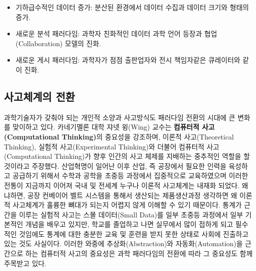 \documentclass[smallextended]{svjour3}       %
\providecommand{\tightlist}{%
  \setlength{\itemsep}{0pt}\setlength{\parskip}{0pt}}
\begin{document}
\begin{itemize}
\tightlist
\item
  기하급수적인 데이터 증가: 분산된 환경에서 데이터 수집과 데이터 크기와
  형태의 증가.
\item
  새로운 분석 패러다임: 과학자 친화적인 데이터 과학 언어 등장과
  협업(Collaboration) 모델의 진화.
\item
  새로운 게시 패러다임: 과학자가 점점 출판업자와 전시 책임자같은
  큐레이터와 같이 진화.
\end{itemize}

\hypertarget{uxc0acuxace0uxccb4uxacc4uxc758-uxc804uxd658}{%
\subsection{사고체계의
전환}\label{uxc0acuxace0uxccb4uxacc4uxc758-uxc804uxd658}}

과학기술자가 갖춰야 되는 개인적 소양과 사고방식도 패러다임 전환의 시대에
큰 변화를 맞이하고 있다. 카네기멜론 대학 쟈넷 윙(Wing)
교수\citep{wing2006computational}는 \textbf{컴퓨터적 사고(Computational
Thinking)}의 중요성을 강조하며, 이론적 사고(Theoretical Thinking),
실험적 사고(Experimental Thinking)와 더불어 컴퓨터적 사고(Computational
Thinking)가 향후 인간의 사고 체제를 지배하는 중추적인 역할을 할 것이라고
주장했다. 산업혁명이 일어난 이후 산업, 즉 공장에서 필요한 인력을
육성하고 공급하기 위해서 수학과 공학을 초중등 과정에서 집중적으로
교육하였으며 이러한 전통이 지금까지 이어져 국내 및 전세계 누구나 이론적
사고체계는 내재화 되었다. 왜냐하면, 공장 컨베이어 벨트 시스템을 통해서
생산되는 제품생산과정 생각하면 왜 이론적 사고체계가 훌륭한 뼈대가 되는지
어렵지 않게 이해할 수 있기 때문이다. 통계가 근간을 이루는 실험적 사고는
스몰 데이터(Small Data)를 일부 초중등 과정에서 일부 기본적인 개념을
배우고 있지만, 학교를 졸업하고 나면 실무에서 많이 접하게 되고 필수적인
것임에도 통계에 대한 충분한 교육 및 훈련을 받지 못한 상태로 사회에
진출하고 있는 것도 사실이다. 이러한 와중에 추상화(Abstraction)와
자동화(Automation)을 근간으로 하는 컴퓨터적 사고의 중요성은 과학
패러다임의 전환에 따라 그 중요성도 함께 주목받고 있다.
\end{document}
